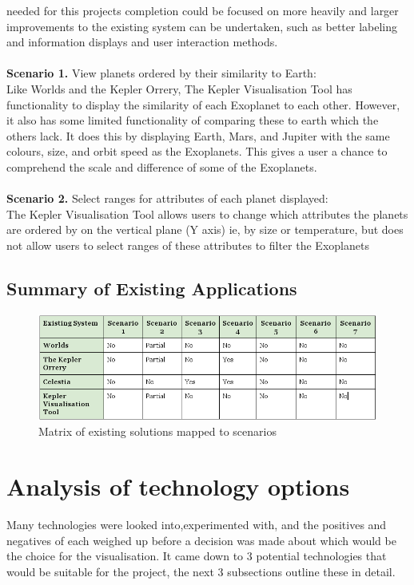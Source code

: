 needed for this projects completion could be focused on more heavily and larger
improvements to the existing system can be undertaken, such as better labeling
and information displays and user interaction methods.
\\\\
{\bf Scenario 1.} View planets ordered by their similarity to Earth:\\
Like Worlds and the Kepler Orrery, The Kepler Visualisation Tool has
functionality to display the similarity of each Exoplanet to each other.
However, it also has some limited functionality of comparing these to earth
which the others lack. It does this by displaying Earth, Mars, and Jupiter with
the same colours, size, and orbit speed as the Exoplanets. This gives a user a
chance to comprehend the scale and difference of some of the Exoplanets.
\\\\
{\bf Scenario 2.} Select ranges for attributes of each planet displayed:\\
The Kepler Visualisation Tool allows users to change which attributes the
planets are ordered by on the vertical plane (Y axis) ie, by size or
temperature, but does not allow users to select ranges of these attributes to
filter the Exoplanets

\subsection{Summary of Existing Applications}
\begin{figure}[h!]
  \centering
      \includegraphics[width=1\textwidth]{images/existing.png}
  \caption{Matrix of existing solutions mapped to scenarios}  
    \label{fig:existing}
\end{figure}


\section{Analysis of technology options}
Many technologies were looked into,experimented with, and the positives and
negatives of each weighed up before a decision was made about which would be the
choice for the visualisation. It came down to 3 potential technologies that
would be suitable for the project, the next 3 subsections outline these in
detail.

